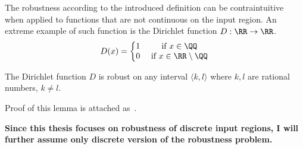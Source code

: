 %
%
%

The robustness according to the introduced definition can be contraintuitive
when applied to functions that are not continuous on the input region.
An extreme example of such function is the Dirichlet function $D: \RR\to \RR$.
\begin{equation*}
    D(x) = \left\{
        \begin{matrix}
            1 & \text{ if } x\in \QQ\\
            0 & \text{ if } x\in \RR\setminus \QQ
        \end{matrix}
        \right.
\end{equation*}

\begin{lemma}{The Dirichlet function $D$ is robust on any interval $\langle k, l\rangle$
    where $k, l$ are rational numbers, $k\neq l$.}

    Proof of this lemma is attached as~.
\end{lemma}

\noindent\textbf{%
Since this thesis focuses on robustness of discrete input regions,
I will further assume only discrete version of the robustness problem.%
}

